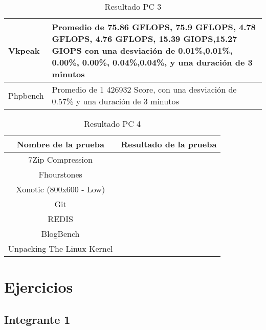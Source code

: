 \documentclass[12pt]{article}
\begin{document}
\begin{table}[!htb]
\begin{tabular}{|p{5cm}|p{9cm}|}
        \hline
        Vkpeak & Promedio de 75.86 GFLOPS, 75.9 GFLOPS, 4.78 GFLOPS, 4.76 GFLOPS, 15.39 GIOPS,15.27 GIOPS\newline
        con una desviación de 0.01\%,0.01\%, 0.00\%, 0.00\%, 0.04\%,0.04\%, \newline
        y una duración de 3 minutos \\
        \hline
        Phpbench & Promedio de 1 426932 Score, \newline
        con una desviación de 0.57\% \newline
        y una duración de 3 minutos \\
        \hline
    \end{tabular}
    \caption{Resultado PC 3}
\end{table}

\begin{table}[!htb]
    \centering
    \begin{tabular}{|c|c|}
        \hline
        \textbf{Nombre de la prueba} & \textbf{Resultado de la prueba}\\
        \hline
        7Zip Compression &  \\
        \hline
        Fhourstones &  \\
        \hline
        Xonotic (800x600 - Low) &  \\
        \hline
        Git &  \\
        \hline
        REDIS &  \\
        \hline
        BlogBench &  \\
        \hline
        Unpacking The Linux Kernel &  \\
        \hline
    \end{tabular}
    \caption{Resultado PC 4}
\end{table}

\newpage
\section{Ejercicios}
\subsection{Integrante 1}
\end{document}
